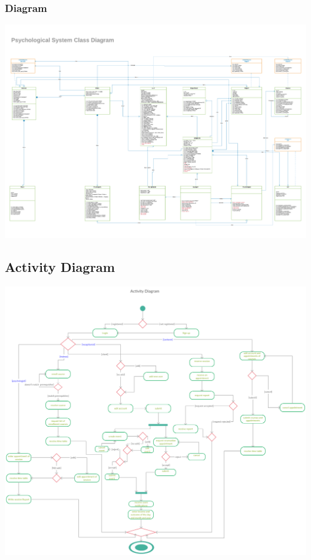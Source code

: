 \documentclass[../Psychological_system_web_application.tex]{subfiles}
\begin{document}
						\subsubsection{Diagram}
						\includegraphics[width=\textwidth ,height=0.9\textheight ,scale=4]{Diagrams/Class_Diagram_for_Psychological_System.pdf}	
						\label{FIG:2.05}
						
					\subsection{Activity Diagram}
						
							\includegraphics[width=\textwidth ,height=0.9\textheight ,scale=4]{Diagrams/Activity_Of_Psychological_System.pdf}
							\label{FIG:2.06}
						
\end{document}
